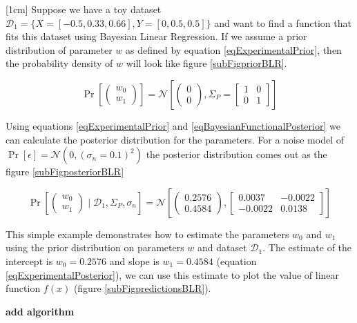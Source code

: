 \begin{mdframed}[hidealllines=true,backgroundcolor=lightgray!20]
[1cm]
Suppose we have a toy dataset $\mathcal{D}_{1} = \{X = [-0.5, 0.33, 0.66], Y = [0, 0.5, 0.5]\}$ and want to find a function that fits this dataset using Bayesian Linear Regression. If we assume a prior distribution of parameter $w$ as defined by equation \ref{eqExperimentalPrior}, then the probability density of $w$ will look like figure \ref{subFigpriorBLR}.

\begin{equation}\label{eqExperimentalPrior}
\Pr \left [\begin{pmatrix}
w_{0}\\ 
w_{1}
\end{pmatrix} \right ] = \mathcal{N}\left [ \begin{pmatrix}
0\\ 
0
\end{pmatrix}, \Sigma_{P} = \begin{bmatrix}
1 & 0\\ 
0 & 1
\end{bmatrix} \right ]
\end{equation}

Using equations \ref{eqExperimentalPrior} and \ref{eqBayesianFunctionalPosterior} we can calculate the posterior distribution for the parameters. For a noise model of $\Pr[\epsilon] = \mathcal{N}(0, (\sigma_{n}=0.1)^2)$ the posterior distribution comes out as the figure \ref{subFigposteriorBLR}

\begin{equation}\label{eqExperimentalPosterior}
\Pr \left [\begin{pmatrix}
w_{0}\\ 
w_{1}
\end{pmatrix} \mid \mathcal{D}_{1}, \Sigma_{P}, \sigma_{n} \right ] = \mathcal{N}\left [ \begin{pmatrix}
0.2576\\ 
0.4584
\end{pmatrix}, \begin{bmatrix}
0.0037 & -0.0022\\ 
-0.0022 & 0.0138
\end{bmatrix} \right ]
\end{equation}

This simple example demonstrates how to estimate the parameters $w_{0}$ and $w_{1}$ using the prior distribution on parameters $w$ and dataset $\mathcal{D}_{1}$. The estimate of the intercept is $w_{0} = 0.2576$ and slope is $w_{1} = 0.4584$ (equation \ref{eqExperimentalPosterior}), we can use this estimate to plot the value of linear function $f(x)$ (figure \ref{subFigpredictionsBLR}). 

\textbf{ add algorithm}

\end{mdframed}

